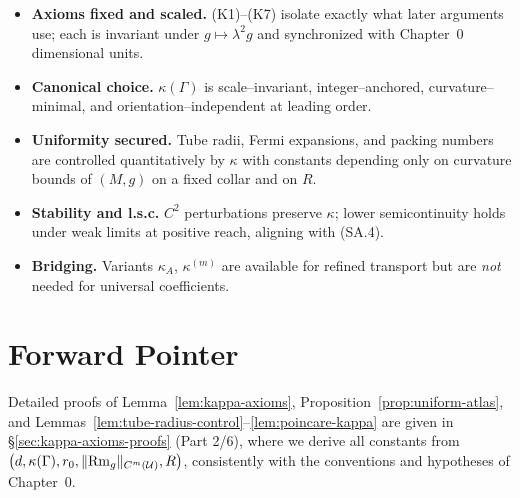 \begin{itemize}
\item \textbf{Axioms fixed and scaled.} (K1)–(K7) isolate exactly what later arguments use; each is invariant under $g\mapsto \lambda^2 g$ and synchronized with Chapter~0 dimensional units.
\item \textbf{Canonical choice.} $\kappa(\Gamma)$ is scale–invariant, integer–anchored, curvature–minimal, and orientation–independent at leading order.
\item \textbf{Uniformity secured.} Tube radii, Fermi expansions, and packing numbers are controlled quantitatively by $\kappa$ with constants depending only on curvature bounds of $(M,g)$ on a fixed collar and on $R$.
\item \textbf{Stability and l.s.c.} $C^2$ perturbations preserve $\kappa$; lower semicontinuity holds under weak limits at positive reach, aligning with (SA.4).
\item \textbf{Bridging.} Variants $\kappa_A$, $\kappa^{(m)}$ are available for refined transport but are \emph{not} needed for universal coefficients.
\end{itemize}

\bigskip


\section*{Forward Pointer}
Detailed proofs of Lemma~\ref{lem:kappa-axioms}, Proposition~\ref{prop:uniform-atlas}, and Lemmas~\ref{lem:tube-radius-control}–\ref{lem:poincare-kappa} are given in \S\ref{sec:kappa-axioms-proofs} (Part 2/6), where we derive all constants from $\big(d,\kappa(\Gamma),r_0,\|{\rm Rm}_g\|_{C^m(\mathcal{U})},R\big)$, consistently with the conventions and hypotheses of Chapter~0.


